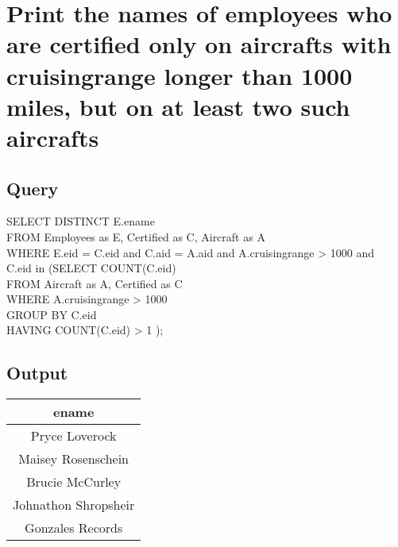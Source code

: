 \documentclass[11pt]{scrartcl} %
\begin{document}


\section{Print the names of employees who are certified only on aircrafts with cruisingrange longer than 1000 miles, but on at least two such aircrafts }

\subsection{Query}
SELECT DISTINCT E.ename\\
  FROM Employees as E, Certified as C, Aircraft as A\\
  WHERE E.eid = C.eid and
        C.aid = A.aid and
        A.cruisingrange > 1000 and\\
 \hspace*{13mm}      C.eid in
        (SELECT COUNT(C.eid)\\
     \hspace*{13mm}      FROM Aircraft as A, Certified as C\\
       \hspace*{13mm}    WHERE A.cruisingrange > 1000\\
       \hspace*{13mm}    GROUP BY C.eid\\
       \hspace*{13mm}    HAVING COUNT(C.eid) > 1
         );
\subsection{Output}
\begin{left}
\begin{tabular}{ | c | }
\hline
\textbf{ename} \\
\hline
Pryce Loverock\\
Maisey Rosenschein\\
Brucie McCurley\\
Johnathon Shropsheir\\
Gonzales Records\\

\hline
\end{tabular}
\end{left}


\end{document}
